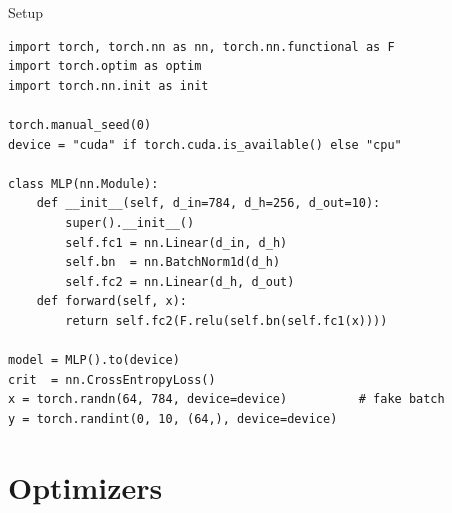 \documentclass[10pt,aspectratio=169]{beamer}
\begin{document}
\begin{frame}[fragile]{Setup}
\begin{lstlisting}
import torch, torch.nn as nn, torch.nn.functional as F
import torch.optim as optim
import torch.nn.init as init

torch.manual_seed(0)
device = "cuda" if torch.cuda.is_available() else "cpu"

class MLP(nn.Module):
    def __init__(self, d_in=784, d_h=256, d_out=10):
        super().__init__()
        self.fc1 = nn.Linear(d_in, d_h)
        self.bn  = nn.BatchNorm1d(d_h)
        self.fc2 = nn.Linear(d_h, d_out)
    def forward(self, x):
        return self.fc2(F.relu(self.bn(self.fc1(x))))

model = MLP().to(device)
crit  = nn.CrossEntropyLoss()
x = torch.randn(64, 784, device=device)          # fake batch
y = torch.randint(0, 10, (64,), device=device)
\end{lstlisting}
\end{frame}

\section{Optimizers}
\end{document}
